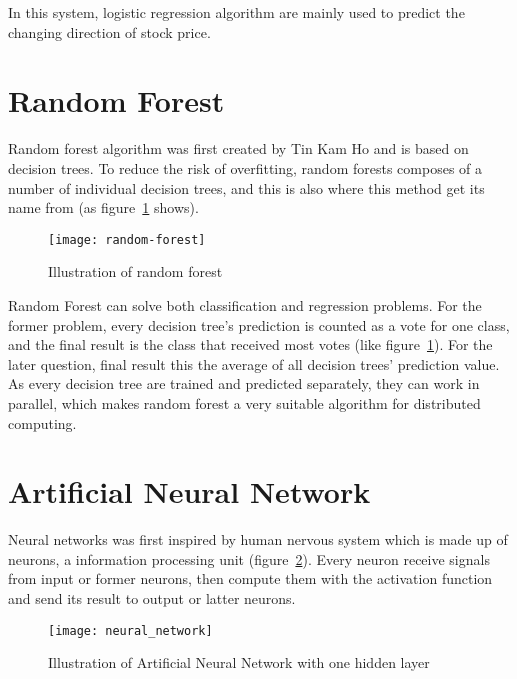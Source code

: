 In this system, logistic regression algorithm are mainly used to predict the changing direction of stock price.

\section{Random Forest}
Random forest algorithm was first created by Tin Kam Ho\cite{ho1995random} and is based on decision trees. To reduce the risk of overfitting, random forests composes of a number of individual decision trees, and this is also where this method get its name from (as figure~\ref{fg:decision-tree} shows).
\begin{figure}[h]
	\centering
	\texttt{[image: random-forest]}
	\caption{Illustration of random forest}
	\label{fg:decision-tree}
\end{figure}

Random Forest can solve both classification and regression problems. For the former problem, every decision tree's prediction is counted as a vote for one class, and the final result is the class that received most votes (like figure~\ref{fg:decision-tree}). For the later question, final result this the average of all decision trees' prediction value.\\


As every decision tree are trained and predicted separately, they can work in parallel, which makes random forest a very suitable algorithm for distributed computing.


\section{Artificial Neural Network}
Neural networks was first inspired by human nervous system which is made up of neurons, a information processing unit (figure~\ref{fg:neural-nework}). Every neuron receive signals from input or former neurons, then compute them with the activation function and send its result to output or latter neurons\cite{russell2003artificial}.
\begin{figure}[h]
	\centering
	\texttt{[image: neural\_network]}
	\caption{Illustration of Artificial Neural Network with one hidden layer}
	\label{fg:neural-nework}
\end{figure}

